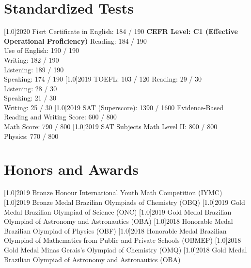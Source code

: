 \documentclass{cv-style}
\begin{document}
\section{Standardized Tests}
  \vspace{-0.2cm}
    \begin{entrylist}
        \entry
            {\scalebox{.8}[1.0]{2020}}
            {Fisrt Certificate in English: 184 / 190}
            {\textbf{CEFR Level: C1 (Effective Operational     Proficiency)}}
            {Reading: 184 / 190\\ Use of English: 190 / 190\\ Writing: 182 / 190\\ Listening: 189 / 190\\ Speaking: 174 / 190}
        \entry
            {\scalebox{.8}[1.0]{2019}}
            {TOEFL: 103 / 120} 
            {}
            {Reading: 29 / 30\\ Listening: 28 / 30    \\ Speaking: 21 / 30\\ Writing: 25 / 30}
        \entry
            {\scalebox{.8}[1.0]{2019}}
            {SAT (Superscore): 1390 / 1600} 
            {}
            {Evidence-Based Reading and Writing Score: 600 / 800\\ Math Score: 790 / 800}
        \entry
            {\scalebox{.8}[1.0]{2019}}
            {SAT Subjects}
            {}
            {Math Level II: 800 / 800\\ Physics: 770 / 800}
\end{entrylist}

\section{Honors and Awards}
    \vspace{-0.2cm}
    \begin{entrylist}
        \entry
            {\scalebox{.8}[1.0]{2019}}
            {Bronze Honour}
            {}
            {International Youth Math Competition (IYMC)}
        \entry
            {\scalebox{.8}[1.0]{2019}}
            {Bronze Medal}
            {}
            {Brazilian Olympiads of Chemistry (OBQ)}
        \entry
            {\scalebox{.8}[1.0]{2019}}
            {Gold Medal}
            {}
            {Brazilian Olympiad of Science (ONC)}
        \entry
            {\scalebox{.8}[1.0]{2019}}
            {Gold Medal}
            {}
            {Brazilian Olympiad of Astronomy and Astronautics (OBA)}
        \entry
            {\scalebox{.8}[1.0]{2018}}
            {Honorable Medal}
            {}
            {Brazilian Olympiad of Physics (OBF)}
        \entry
            {\scalebox{.8}[1.0]{2018}}
            {Honorable Medal}
            {}
            {Brazilian Olympiad of Mathematics from Public and Private Schools (OBMEP)}
        \entry
            {\scalebox{.8}[1.0]{2018}}
            {Gold Medal}
            {}
            {Minas Gerais's Olympiad of Chemistry (OMQ)}
        \entry
            {\scalebox{.8}[1.0]{2018}}
            {Gold Medal}
            {}
            {Brazilian Olympiad of Astronomy and Astronautics (OBA)}
            
    \end{entrylist}
\end{document}
